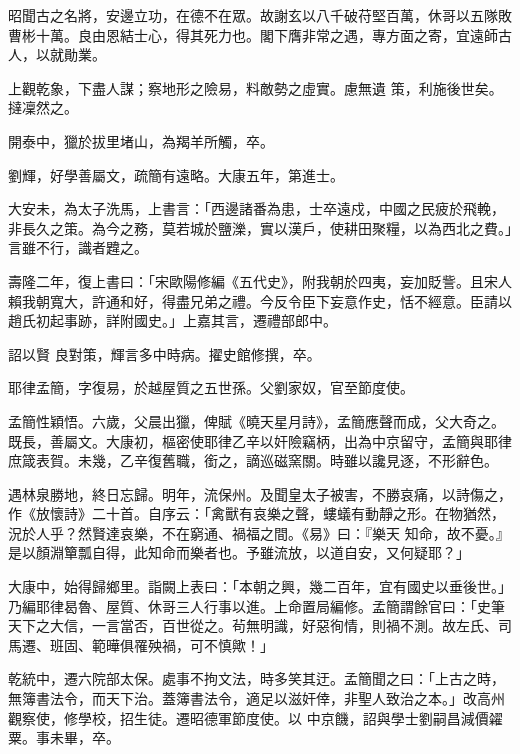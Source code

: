 \begin{pinyinscope}
 昭聞古之名將，安邊立功，在德不在眾。故謝玄以八千破苻堅百萬，休哥以五隊敗曹彬十萬。良由恩結士心，得其死力也。閣下膺非常之遇，專方面之寄，宜遠師古人，以就勛業。



 上觀乾象，下盡人謀；察地形之險易，料敵勢之虛實。慮無遺
 策，利施後世矣。撻凜然之。



 開泰中，獵於拔里堵山，為羯羊所觸，卒。



 劉輝，好學善屬文，疏簡有遠略。大康五年，第進士。



 大安未，為太子洗馬，上書言：「西邊諸番為患，士卒遠戍，中國之民疲於飛輓，非長久之策。為今之務，莫若城於鹽濼，實以漢戶，使耕田聚糧，以為西北之費。」言雖不行，識者韙之。



 壽隆二年，復上書曰：「宋歐陽修編《五代史》，附我朝於四夷，妄加貶訾。且宋人賴我朝寬大，許通和好，得盡兄弟之禮。今反令臣下妄意作史，恬不經意。臣請以趙氏初起事跡，詳附國史。」上嘉其言，遷禮部郎中。



 詔以賢
 良對策，輝言多中時病。擢史館修撰，卒。



 耶律孟簡，字復易，於越屋質之五世孫。父劉家奴，官至節度使。



 孟簡性穎悟。六歲，父晨出獵，俾賦《曉天星月詩》，孟簡應聲而成，父大奇之。既長，善屬文。大康初，樞密使耶律乙辛以奸險竊柄，出為中京留守，孟簡與耶律庶箴表賀。未幾，乙辛復舊職，銜之，謫巡磁窯關。時雖以讒見逐，不形辭色。



 遇林泉勝地，終日忘歸。明年，流保州。及聞皇太子被害，不勝哀痛，以詩傷之，作《放懷詩》二十首。自序云：「禽獸有哀樂之聲，螻蟻有動靜之形。在物猶然，況於人乎？然賢達哀樂，不在窮通、禍福之間。《易》曰：『樂天
 知命，故不憂。』是以顏淵簞瓢自得，此知命而樂者也。予雖流放，以道自安，又何疑耶？」



 大康中，始得歸鄉里。詣闕上表曰：「本朝之興，幾二百年，宜有國史以垂後世。」乃編耶律曷魯、屋質、休哥三人行事以進。上命置局編修。孟簡謂餘官曰：「史筆天下之大信，一言當否，百世從之。茍無明識，好惡徇情，則禍不測。故左氏、司馬遷、班固、範曄俱罹殃禍，可不慎歟！」



 乾統中，遷六院部太保。處事不拘文法，時多笑其迂。孟簡聞之曰：「上古之時，無簿書法令，而天下治。蓋簿書法令，適足以滋奸倖，非聖人致治之本。」改高州觀察使，修學校，招生徒。遷昭德軍節度使。以
 中京饑，詔與學士劉嗣昌減價糴粟。事未畢，卒。




\end{pinyinscope}
